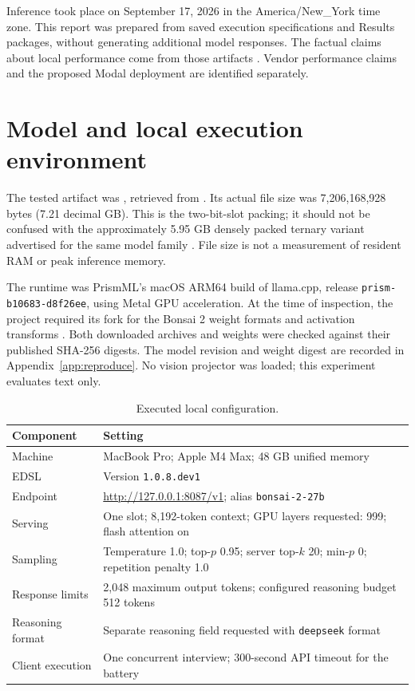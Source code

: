 \documentclass[11pt,letterpaper]{article}
\begin{document}
Inference took place on September 17, 2026 in the America/New\_York time zone.
This report was prepared from saved execution specifications and Results
packages, without generating additional model responses. The factual claims
about local performance come from those artifacts \citep{edslartifact}.
Vendor performance claims and the proposed Modal deployment are identified
separately.

\section{Model and local execution environment}
The tested artifact was , retrieved
from . Its actual file size was
7,206,168,928 bytes (7.21 decimal GB). This is the two-bit-slot packing; it
should not be confused with the approximately 5.95 GB densely packed ternary
variant advertised for the same model family \citep{prismmodel}.
File size is not a measurement of resident RAM or peak inference memory.

The runtime was PrismML's macOS ARM64 build of llama.cpp, release
\texttt{prism-b10683-d8f26ee}, using Metal GPU acceleration. At the time of
inspection, the project required its fork for the Bonsai 2 weight formats
and activation transforms \citep{prismruntime}. Both downloaded archives and
weights were checked against their published SHA-256 digests. The model
revision and weight digest are recorded in Appendix~\ref{app:reproduce}.
No vision projector was loaded; this experiment evaluates text only.

\begin{table}[htbp]
\centering\small
\caption{Executed local configuration.}
\begin{tabularx}{\linewidth}{@{}lY@{}}
\toprule
Component & Setting \\
\midrule
Machine & MacBook Pro; Apple M4 Max; 48 GB unified memory \\
EDSL & Version \texttt{1.0.8.dev1} \\
Endpoint & \url{http://127.0.0.1:8087/v1}; alias \texttt{bonsai-2-27b} \\
Serving & One slot; 8,192-token context; GPU layers requested: 999; flash attention on \\
Sampling & Temperature 1.0; top-$p$ 0.95; server top-$k$ 20; min-$p$ 0; repetition penalty 1.0 \\
Response limits & 2,048 maximum output tokens; configured reasoning budget 512 tokens \\
Reasoning format & Separate reasoning field requested with \texttt{deepseek} format \\
Client execution & One concurrent interview; 300-second API timeout for the battery \\
\bottomrule
\end{tabularx}
\label{tab:config}
\end{table}
\end{document}
